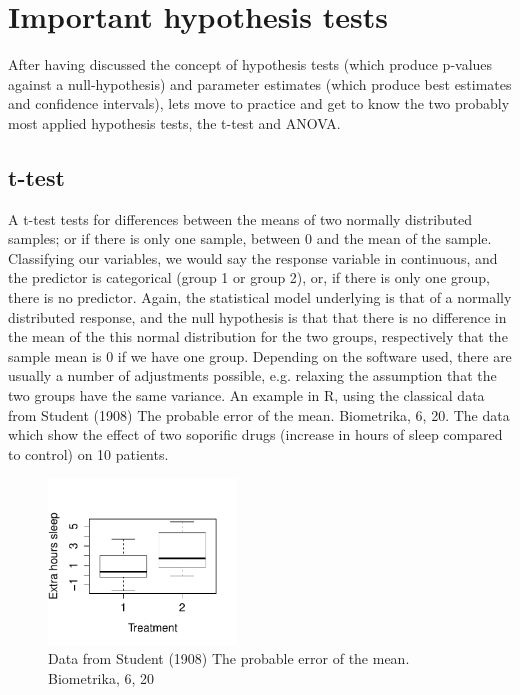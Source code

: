 \documentclass[a4paper,twoside]{tufte-book} %
\begin{document}
\chapter{Important hypothesis tests}

After having discussed the concept of hypothesis tests (which produce p-values against a null-hypothesis) and parameter estimates (which produce best estimates and confidence intervals), lets move to practice and get to know the two probably most applied hypothesis tests, the t-test and ANOVA.

\section{t-test}

A t-test tests for differences between the means of two normally distributed samples; or if there is only one sample, between 0 and the mean of the sample. Classifying our variables, we would say the response variable in continuous, and the predictor is categorical (group 1 or group 2), or, if there is only one group, there is no predictor. Again, the statistical model underlying is that of a normally distributed response, and the null hypothesis is that that there is no difference in the mean of the this normal distribution for the two groups, respectively that the sample mean is 0 if we have one group. Depending on the software used, there are usually a number of adjustments possible, e.g. relaxing the assumption that the two groups have the same variance. An example in R, using the classical data from Student (1908) The probable error of the mean. Biometrika, 6, 20. The data which show the effect of two soporific drugs (increase in hours of sleep compared to control) on 10 patients. 

\begin{figure}[htbp]
\begin{center}
\includegraphics[width=5cm]{ttest}
\caption{Data from Student (1908) The probable error of the mean. Biometrika, 6, 20}
\label{fig: Student Sleep Data}
\end{center}
\end{figure}
\end{document}
